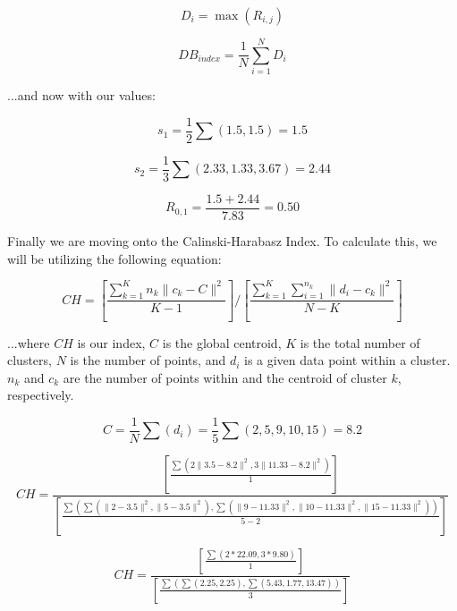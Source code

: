 \documentclass{article}
\begin{document}
\begin{equation}
    D_i = \max(R_{i,j})
\end{equation}

\begin{equation}
    DB_{index} = \frac{1}{N} \sum^N_{i=1} D_i
\end{equation}

\noindent ...and now with our values:

\begin{equation}
    s_1 = \frac{1}{2} \sum (1.5, 1.5) = 1.5
\end{equation}

\begin{equation}
    s_2 = \frac{1}{3} \sum (2.33, 1.33, 3.67) = 2.44
\end{equation}

\begin{equation}
    R_{0,1} = \frac{1.5 + 2.44}{7.83} = 0.50
\end{equation}


Finally we are moving onto the Calinski-Harabasz Index. To calculate this, we will be utilizing the following equation:

\begin{equation}
    CH = \left\lbrack \frac{\sum^K_{k=1} n_k \|c_k-C\|^2}{K-1} \right\rbrack / \left\lbrack \frac{\sum^K_{k=1} \sum^{n_k}_{i=1} \| d_i - c_k \|^2}{N-K}\right\rbrack
\end{equation}

\noindent ...where $CH$ is our index, $C$ is the global centroid, $K$ is the total number of clusters, $N$ is the number of points, and $d_i$ is a given data point within a cluster. $n_k$ and $c_k$ are the number of points within and the centroid of cluster $k$, respectively.

\begin{equation}
    C = \frac{1}{N} \sum (d_i) = \frac{1}{5} \sum (2,5,9,10,15) = 8.2
\end{equation}

\begin{equation}
    CH = \frac{\left\lbrack \frac{\sum (2\|3.5-8.2\|^2, 3\|11.33-8.2\|^2)}{1} \right\rbrack} { \left\lbrack \frac{\sum (\sum (\|2-3.5\|^2, \|5-3.5\|^2), \sum(\|9-11.33\|^2, \|10-11.33\|^2, \|15-11.33\|^2) )}{5-2} \right\rbrack}
\end{equation}

\begin{equation}
    CH = \frac{\left\lbrack \frac{\sum (2*22.09, 3*9.80)}{1} \right\rbrack} { \left\lbrack \frac{\sum (\sum (2.25, 2.25), \sum(5.43, 1.77, 13.47) )}{3} \right\rbrack}
\end{equation}
\end{document}
